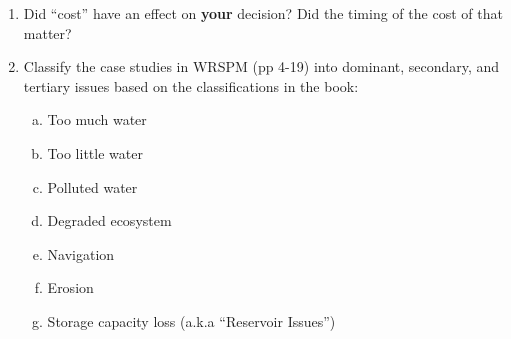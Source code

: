 \documentclass[12pt]{article}
\begin{document}
\begin{enumerate}
\item Did ``cost'' have an effect on \textbf{your} decision?   Did the timing of the cost of that matter?   
\item Classify the case studies in WRSPM (pp 4-19) into dominant, secondary, and tertiary issues based on the classifications in the book:
\begin{enumerate}[a)]
\item Too much water
\item Too little water
\item Polluted water
\item Degraded ecosystem
\item Navigation
\item Erosion
\item Storage capacity loss (a.k.a ``Reservoir Issues'')
\end{enumerate}

\end{enumerate}

%
\end{document}
